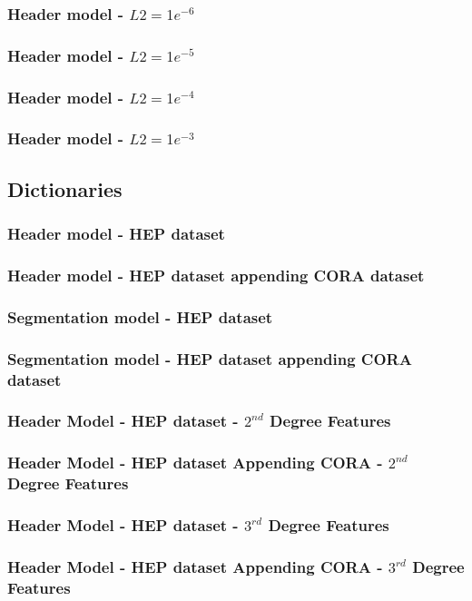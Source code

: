 \documentclass[10pt, oneside]{scrartcl}   	%
\begin{document}
\subsubsection{Header model - $L2 = 1e^{-6}$}
\subsubsection{Header model - $L2 = 1e^{-5}$}
\subsubsection{Header model - $L2 = 1e^{-4}$}
\subsubsection{Header model - $L2 = 1e^{-3}$}
\subsection{Dictionaries}
\subsubsection{Header model - HEP dataset}
\subsubsection{Header model - HEP dataset appending CORA dataset}
\subsubsection{Segmentation model - HEP dataset}
\subsubsection{Segmentation model - HEP dataset appending CORA dataset}
\subsubsection{Header Model - HEP dataset - $2^{nd}$ Degree Features}
\subsubsection{Header Model - HEP dataset Appending CORA - $2^{nd}$ Degree Features}
\subsubsection{Header Model - HEP dataset - $3^{rd}$ Degree Features}
\subsubsection{Header Model - HEP dataset Appending CORA - $3^{rd}$ Degree Features}
\end{document}
